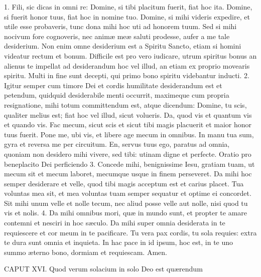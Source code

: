 1. Fili, sic dicas in omni re: Domine, si tibi placitum fuerit, fiat hoc ita. Domine, si fuerit honor tuus, fiat hoc in nomine tuo. Domine, si mihi videris expedire, et utile esse probaveris, tunc dona mihi hoc uti ad honorem tuum. Sed si mihi nocivum fore cognoveris, nec animæ meæ saluti prodesse, aufer a me tale desiderium. Non enim omne desiderium est a Spiritu Sancto, etiam si homini videatur rectum et bonum. Difficile est pro vero iudicare, utrum spiritus bonus an alienus te impellat ad desiderandum hoc vel illud, an etiam ex proprio movearis spiritu. Multi in fine sunt decepti, qui primo bono spiritu videbantur inducti.
2. Igitur semper cum timore Dei et cordis humilitate desiderandum est et petendum, quidquid desiderabile menti occurrit, maximeque cum propria resignatione, mihi totum committendum est, atque dicendum: Domine, tu scis, qualiter melius est; fiat hoc vel illud, sicut volueris. Da, quod vis et quantum vis et quando vis. Fac mecum, sicut scis et sicut tibi magis placuerit et maior honor tuus fuerit. Pone me, ubi vis, et libere age mecum in omnibus. In manu tua sum, gyra et reversa me per circuitum. En, servus tuus ego, paratus ad omnia, quoniam non desidero mihi vivere, sed tibi: utinam digne et perfecte.
Oratio pro beneplacito Dei perficiendo
3. Concede mihi, benignissime Iesu, gratiam tuam, ut mecum sit et mecum laboret, mecumque usque in finem perseveret. Da mihi hoc semper desiderare et velle, quod tibi magis acceptum est et carius placet. Tua voluntas mea sit, et mea voluntas tuam semper sequatur et optime ei concordet. Sit mihi unum velle et nolle tecum, nec aliud posse velle aut nolle, nisi quod tu vis et nolis.
4. Da mihi omnibus mori, quæ in mundo sunt, et propter te amare contemni et nesciri in hoc sæculo. Da mihi super omnia desiderata in te requiescere et cor meum in te pacificare. Tu vera pax cordis, tu sola requies: extra te dura sunt omnia et inquieta. In hac pace in id ipsum, hoc est, in te uno summo æterno bono, dormiam et requiescam. Amen.


CAPUT XVI.
Quod verum solacium in solo Deo est quærendum

